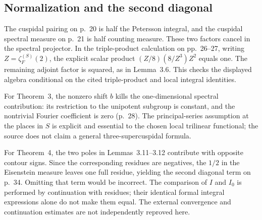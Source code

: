\documentclass[10pt]{article}
\begin{document}
\subsection*{Normalization and the second diagonal}
The cuspidal pairing on p. 20 is half the Petersson integral, and the cuspidal spectral measure on p. 21 is half counting measure. These two factors cancel in the spectral projector. In the triple-product calculation on pp. 26–27, writing \(Z=\zeta_F^{(S)}(2)\), the explicit scalar product \((Z/8)(8/Z^3)Z^2\) equals one. The remaining adjoint factor is squared, as in Lemma 3.6. This checks the displayed algebra conditional on the cited triple-product and local integral identities.\par
For Theorem 3, the nonzero shift \(b\) kills the one-dimensional spectral contribution: its restriction to the unipotent subgroup is constant, and the nontrivial Fourier coefficient is zero (p. 28). The principal-series assumption at the places in \(S\) is explicit and essential to the chosen local trilinear functional; the source does not claim a general three-supercuspidal formula.\par
For Theorem 4, the two poles in Lemmas 3.11–3.12 contribute with opposite contour signs. Since the corresponding residues are negatives, the \(1/2\) in the Eisenstein measure leaves one full residue, yielding the second diagonal term on p. 34. Omitting that term would be incorrect. The comparison of \(I\) and \(I_0\) is performed by continuation with residues; their identical formal integral expressions alone do not make them equal. The external convergence and continuation estimates are not independently reproved here.\par
\end{document}
